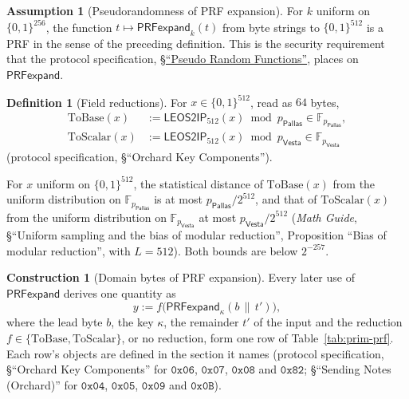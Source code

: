 \documentclass[11pt,a4paper]{article}
\theoremstyle{definition}
\newtheorem{definition}[theorem]{Definition}
\newtheorem{construction}[theorem]{Construction}
\newtheorem{assumption}[theorem]{Assumption}
\newcommand{\F}{\mathbb{F}}
\newcommand{\Pallas}{\ensuremath{\mathsf{Pallas}}}
\newcommand{\Vesta}{\ensuremath{\mathsf{Vesta}}}
\begin{document}
\begin{assumption}[Pseudorandomness of PRF expansion]\label{ass:prf-expand}
For $k$ uniform on $\{0,1\}^{256}$, the function
$t \mapsto \mathsf{PRFexpand}_k(t)$ from byte strings to $\{0,1\}^{512}$ is
a PRF in the sense of the preceding definition. This is the security
requirement that the protocol specification,
\href{https://zips.z.cash/protocol/protocol.pdf#concreteprfs}%
{\S``Pseudo Random Functions''}, places on $\mathsf{PRFexpand}$.
\end{assumption}

\begin{definition}[Field reductions]
For $x \in \{0,1\}^{512}$, read as $64$ bytes,
\begin{align*}
  \mathrm{ToBase}(x) &:= \mathsf{LEOS2IP}_{512}(x) \bmod p_{\Pallas}
    \in \F_{p_{\Pallas}}, \\
  \mathrm{ToScalar}(x) &:= \mathsf{LEOS2IP}_{512}(x) \bmod p_{\Vesta}
    \in \F_{p_{\Vesta}}
\end{align*}
(protocol specification, \S``Orchard Key Components'').
\end{definition}

For $x$ uniform on $\{0,1\}^{512}$, the statistical distance of
$\mathrm{ToBase}(x)$ from the uniform distribution on $\F_{p_{\Pallas}}$ is
at most $p_{\Pallas}/2^{512}$, and that of $\mathrm{ToScalar}(x)$ from the
uniform distribution on $\F_{p_{\Vesta}}$ at most $p_{\Vesta}/2^{512}$
(\emph{Math Guide}, \S``Uniform sampling and the bias of modular
reduction'', Proposition ``Bias of modular reduction'', with $L = 512$).
Both bounds are below $2^{-257}$.

\begin{construction}[Domain bytes of PRF expansion]
Every later use of $\mathsf{PRFexpand}$ derives one quantity as
\[
  y := f\bigl(\mathsf{PRFexpand}_{\kappa}(b \,\|\, t')\bigr),
\]
where the lead byte $b$, the key $\kappa$, the remainder $t'$ of the input
and the reduction $f \in \{\mathrm{ToBase}, \mathrm{ToScalar}\}$, or no
reduction, form one row of Table~\ref{tab:prim-prf}. Each row's objects are
defined in the section it names (protocol specification, \S``Orchard Key
Components'' for $\mathtt{0x06}$, $\mathtt{0x07}$, $\mathtt{0x08}$ and
$\mathtt{0x82}$; \S``Sending Notes (Orchard)'' for $\mathtt{0x04}$,
$\mathtt{0x05}$, $\mathtt{0x09}$ and $\mathtt{0x0B}$).
\end{construction}
\end{document}
